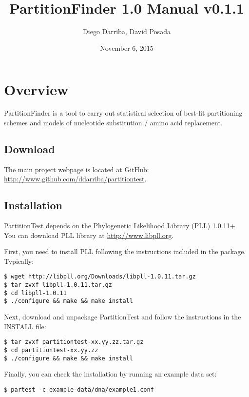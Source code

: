 \documentclass[11pt,twoside,a4paper]{article}
\begin{document}
\providecommand{\versionnumber}{0.1.1}
\title{PartitionFinder 1.0 Manual v\versionnumber}
\author{Diego Darriba, David Posada}
\date{November 6, 2015}
\maketitle

\setcounter{tocdepth}{2}
\tableofcontents

\section{Overview}

PartitionFinder is a tool to carry out statistical selection of best-fit partitioning schemes and models of nucleotide substitution / amino acid replacement.

\subsection{Download}

The main project webpage is located at GitHub: \url{http://www.github.com/ddarriba/partitiontest}.

\subsection{Installation}

PartitionTest depends on the Phylogenetic Likelihood Library (PLL) 1.0.11+.
You can download PLL library at \url{http://www.libpll.org}.

First, you need to install PLL following the instructions included in the package. Typically:

\begin{verbatim}
$ wget http://libpll.org/Downloads/libpll-1.0.11.tar.gz
$ tar zvxf libpll-1.0.11.tar.gz
$ cd libpll-1.0.11
$ ./configure && make && make install
\end{verbatim}

Next, download and unpackage PartitionTest and follow the instructions in the INSTALL file:

\begin{verbatim}
$ tar zvxf partitiontest-xx.yy.zz.tar.gz
$ cd partitiontest-xx.yy.zz
$ ./configure && make && make install
\end{verbatim}

Finally, you can check the installation by running an example data set:

\begin{verbatim}
$ partest -c example-data/dna/example1.conf
\end{verbatim}
\end{document}
